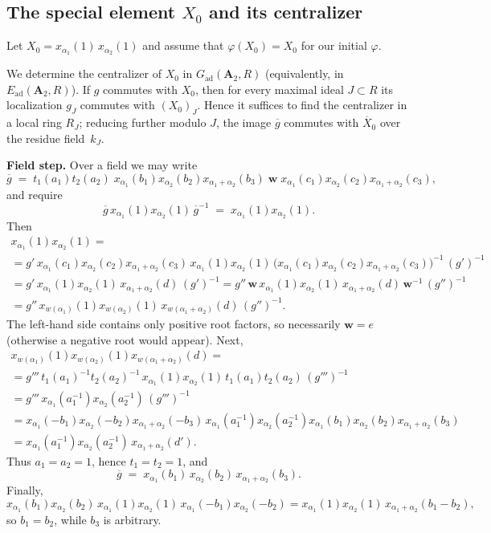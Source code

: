 \documentclass[]{jgcc}
\numberwithin{equation}{section}
\begin{document}
\subsection{\texorpdfstring{The special element $X_0$ and its centralizer}{The special element X0 and its centralizer}}\label{subsec:X0}

Let $X_0=x_{\alpha_1}(1)\,x_{\alpha_2}(1)$ and assume that $\varphi(X_0)=X_0$ for our initial $\varphi$.

We determine the centralizer of $X_0$ in $G_{\mathrm{ad}}(\mathbf A_2,R)$ (equivalently, in $E_{\mathrm{ad}}(\mathbf A_2,R)$).
If $g$ commutes with $X_0$, then for every maximal ideal $J\subset R$ its localization $g_J$ commutes with $(X_0)_J$.
Hence it suffices to find the centralizer in a local ring $R_J$; reducing further modulo $J$, the image $\overline g$ commutes with
$\overline X_0$ over the residue field~$k_J$.

\medskip
\noindent\textbf{Field step.}
Over a field we may write
\[
\overline g \;=\; t_1(a_1)t_2(a_2)\;x_{\alpha_1}(b_1)x_{\alpha_2}(b_2)x_{\alpha_1+\alpha_2}(b_3)\;\mathbf w\;
x_{\alpha_1}(c_1)x_{\alpha_2}(c_2)x_{\alpha_1+\alpha_2}(c_3),
\]
and require
\[
\overline g\,x_{\alpha_1}(1)x_{\alpha_2}(1)\,\overline g^{-1}\;=\;x_{\alpha_1}(1)x_{\alpha_2}(1).
\]
Then
\begin{multline*}
x_{\alpha_1}(1)x_{\alpha_2}(1)
= \\
=g'\,x_{\alpha_1}(c_1)x_{\alpha_2}(c_2)x_{\alpha_1+\alpha_2}(c_3)\,x_{\alpha_1}(1)x_{\alpha_2}(1)\,
\bigl(x_{\alpha_1}(c_1)x_{\alpha_2}(c_2)x_{\alpha_1+\alpha_2}(c_3)\bigr)^{-1}\,(g')^{-1}\\
= g'\,x_{\alpha_1}(1)x_{\alpha_2}(1)\,x_{\alpha_1+\alpha_2}(d)\,(g')^{-1}
= g''\,\mathbf w\,x_{\alpha_1}(1)x_{\alpha_2}(1)\,x_{\alpha_1+\alpha_2}(d)\,\mathbf w^{-1}\,(g'')^{-1}\\
= g''\,x_{w(\alpha_1)}(1)x_{w(\alpha_2)}(1)\,x_{w(\alpha_1+\alpha_2)}(d)\,(g'')^{-1}.
\end{multline*}
The left-hand side contains only positive root factors, so necessarily $\mathbf w=e$ (otherwise a negative root would appear).
Next,
\begin{multline*}
x_{w(\alpha_1)}(1)x_{w(\alpha_2)}(1)x_{w(\alpha_1+\alpha_2)}(d)
=\\
=g'''\,t_1(a_1)^{-1}t_2(a_2)^{-1}\,x_{\alpha_1}(1)x_{\alpha_2}(1)\,t_1(a_1)t_2(a_2)\,(g''')^{-1}\\
= g'''\,x_{\alpha_1}(a_1^{-1})x_{\alpha_2}(a_2^{-1})\,(g''')^{-1}\\
= x_{\alpha_1}(-b_1)x_{\alpha_2}(-b_2)x_{\alpha_1+\alpha_2}(-b_3)\,x_{\alpha_1}(a_1^{-1})x_{\alpha_2}(a_2^{-1})
x_{\alpha_1}(b_1)x_{\alpha_2}(b_2)x_{\alpha_1+\alpha_2}(b_3)\\
= x_{\alpha_1}(a_1^{-1})x_{\alpha_2}(a_2^{-1})\,x_{\alpha_1+\alpha_2}(d').
\end{multline*}
Thus $a_1=a_2=1$, hence $t_1=t_2=1$, and
\[
\overline g \;=\; x_{\alpha_1}(b_1)\,x_{\alpha_2}(b_2)\,x_{\alpha_1+\alpha_2}(b_3).
\]
Finally,
$$
x_{\alpha_1}(b_1)x_{\alpha_2}(b_2)\,x_{\alpha_1}(1)x_{\alpha_2}(1)\,x_{\alpha_1}(-b_1)x_{\alpha_2}(-b_2)
= x_{\alpha_1}(1)x_{\alpha_2}(1)\,x_{\alpha_1+\alpha_2}(b_1-b_2),
$$
so $b_1=b_2$, while $b_3$ is arbitrary.
\end{document}
